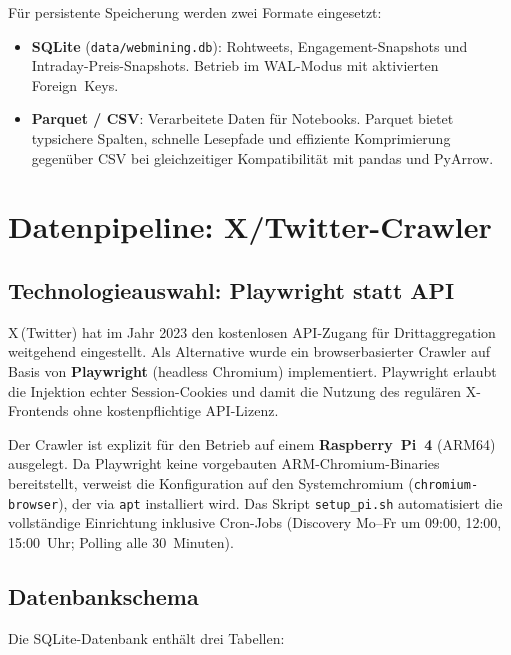 \documentclass[11pt, a4paper]{article}
\begin{document}
Für persistente Speicherung werden zwei Formate eingesetzt:

\begin{itemize}[noitemsep]
  \item \textbf{SQLite} (\texttt{data/webmining.db}): Rohtweets,
        Engagement-Snapshots und Intraday-Preis-Snapshots.
        Betrieb im WAL-Modus mit aktivierten Foreign~Keys.
  \item \textbf{Parquet / CSV}: Verarbeitete Daten für Notebooks.
        Parquet bietet typsichere Spalten, schnelle Lesepfade und effiziente
        Komprimierung gegenüber CSV bei gleichzeitiger Kompatibilität mit
        pandas und PyArrow.
\end{itemize}

\section{Datenpipeline: X/Twitter-Crawler}
\label{sec:crawler}

\subsection{Technologieauswahl: Playwright statt API}

X\,(Twitter) hat im Jahr 2023 den kostenlosen API-Zugang für Drittaggregation
weitgehend eingestellt. Als Alternative wurde ein browserbasierter Crawler auf
Basis von \textbf{Playwright} (headless Chromium) implementiert. Playwright
erlaubt die Injektion echter Session-Cookies und damit die Nutzung des regulären
X-Frontends ohne kostenpflichtige API-Lizenz.

Der Crawler ist explizit für den Betrieb auf einem \textbf{Raspberry~Pi~4}
(ARM64) ausgelegt. Da Playwright keine vorgebauten ARM-Chromium-Binaries
bereitstellt, verweist die Konfiguration auf den Systemchromium
(\texttt{chromium-browser}), der via \texttt{apt} installiert wird.
Das Skript \texttt{setup\_pi.sh} automatisiert die vollständige Einrichtung
inklusive Cron-Jobs (Discovery Mo--Fr um 09:00, 12:00, 15:00~Uhr;
Polling alle 30~Minuten).

\subsection{Datenbankschema}

Die SQLite-Datenbank enthält drei Tabellen:
\end{document}
